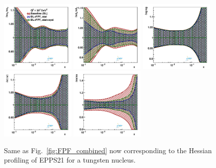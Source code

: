  
\begin{figure}[t]
\centering
\includegraphics[width=0.32\textwidth]{plots/nuclear_fasernu2/FPF/fred05fcorr05_FPF_q2_10000_pdf_uv_ratio.pdf}
\includegraphics[width=0.32\textwidth]{plots/nuclear_fasernu2/FPF/fred05fcorr05_FPF_q2_10000_pdf_dv_ratio.pdf}
\includegraphics[width=0.32\textwidth]{plots/nuclear_fasernu2/FPF/fred05fcorr05_FPF_q2_10000_pdf_g_ratio.pdf}\\
\includegraphics[width=0.32\textwidth]{plots/nuclear_fasernu2/FPF/fred05fcorr05_FPF_q2_10000_pdf_Sea_ratio.pdf}
\includegraphics[width=0.32\textwidth]{plots/nuclear_fasernu2/FPF/fred05fcorr05_FPF_q2_10000_pdf_s_ratio.pdf}
\caption{Same as Fig.~\ref{fig:FPF_combined} now corresponding to the Hessian
 profiling of EPPS21 for a tungsten nucleus.
}
\label{fig:profiling_FPF_nuclear}
\end{figure}

